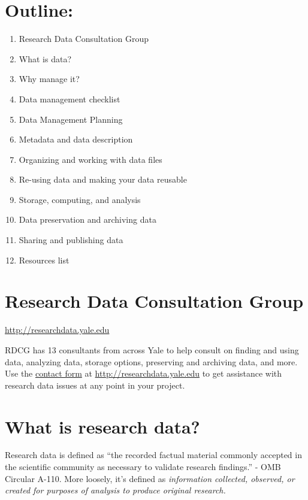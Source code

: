\section{Outline:}\label{outline}

\begin{enumerate}
\def\labelenumi{\arabic{enumi}.}
\tightlist
\item
  Research Data Consultation Group
\item
  What is data?
\item
  Why manage it?
\item
  Data management checklist
\item
  Data Management Planning
\item
  Metadata and data description
\item
  Organizing and working with data files
\item
  Re-using data and making your data reusable
\item
  Storage, computing, and analysis
\item
  Data preservation and archiving data
\item
  Sharing and publishing data
\item
  Resources list
\end{enumerate}

\section{Research Data Consultation
Group}\label{research-data-consultation-group}

\href{http://researchdata.yale.edu/}{http://researchdata.yale.edu}

RDCG has 13 consultants from across Yale to help consult on finding and
using data, analyzing data, storage options, preserving and archiving
data, and more. Use the
\href{http://researchdata.yale.edu/contact}{contact form} at
\href{http://researchdata.yale.edu/}{http://researchdata.yale.edu} to
get assistance with research data issues at any point in your project.

\section{What is research data?}\label{what-is-research-data}

Research data is defined as ``the recorded factual material commonly
accepted in the scientific community as necessary to validate research
findings.'' - OMB Circular A-110. More loosely, it's defined as
\emph{information collected, observed, or created for purposes of
analysis to produce original research.}

